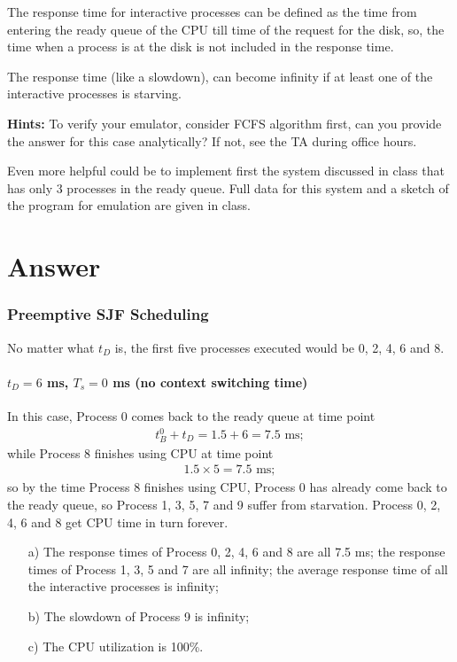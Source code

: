 \documentclass[12pt,letterpaper]{article}
\begin{document}
The response time for interactive processes can be defined as the time from
entering the ready queue of the CPU till time of the request for the disk, so, the time
when a process is at the disk is not included in the response time.

The response time (like a slowdown), can become infinity if at least one of the
interactive processes is starving.

{\bf Hints:} To verify your emulator, consider FCFS algorithm first, can you provide
the answer for this case analytically? If not, see the TA during office hours.

Even more helpful could be to implement first the system discussed in class that
has only 3 processes in the ready queue. Full data for this system and a sketch of the
program for emulation are given in class.

\part*{Answer}
\section{Preemptive SJF Scheduling}
No matter what $t_D$ is, the first five processes executed would be 0, 2, 4, 6 and 8.

\subsection{$t_D=6$ ms, $T_s = 0$ ms (no context switching time)} 
In this case, Process 0 comes back to the ready queue at time point 
\begin{eqnarray}
t_B^0+t_D=1.5+6=7.5\textrm{ ms};
\end{eqnarray}
while Process 8 finishes using CPU at time point 
\begin{eqnarray}
1.5\times5=7.5\textrm{ ms};
\end{eqnarray}
so by the time Process 8 finishes using CPU, Process 0 has already come back to the ready queue, so Process 1, 3, 5, 7 and 9 suffer from starvation. Process 0, 2, 4, 6 and 8 get CPU time in turn forever.
\begin{enumerate}
\item[a)] The response times of Process 0, 2, 4, 6 and 8 are all 7.5 ms; the response times of Process 1, 3, 5 and 7 are all infinity; the average response time of all the interactive processes is infinity;
\item[b)] The slowdown of Process 9 is infinity;
\item[c)] The CPU utilization is 100\%.
\end{enumerate}
\end{document}
